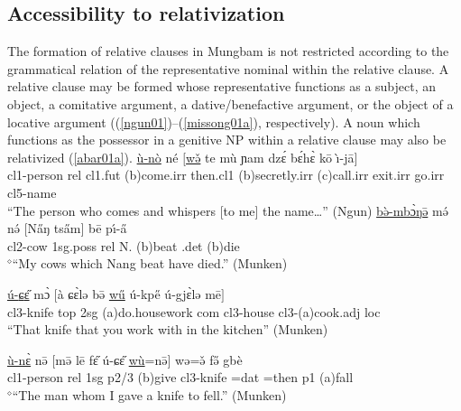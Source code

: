 \documentclass[10pt,twoside]{article}
\makeatletter
\newcommand{\cl}[1]{{\sc cl#1}}
\def\elicited{$^\diamond$}
\def\ML#1{#1\symbol{"1DC6}} %
\renewcommand{\i}{ı}
\def\@{ə}
\def\eh{ɛ}
\def\aw{ɔ}
\def\ng{ŋ}
\def\ny{ɲ}
\def\sh{ɕ}
\def\j{j}
\makeatother
\begin{document}
\subsection{Accessibility to relativization}\label{secMungbamAccessibility}
%

The formation of relative clauses in Mungbam is
not restricted according to the grammatical relation of the
representative nominal within the relative clause.
A relative clause may be formed whose representative
functions as a subject, an object, a comitative argument,
a dative/benefactive argument, or the object of a locative
argument ((\ref{ngun01})--(\ref{missong01a}), respectively).
A noun which functions as the possessor in a genitive NP within
a relative clause may also be relativized (\ref{abar01a}).
%
	\ea	\label{ngun01}
	\gll \uline{\`u-n\`o} n\'e $[$\uline{w\v{\@}} t\ML{e} m\`u \ny\ML{a}m dz\'{\eh} b\'{\eh}h\`{\eh} k\={o} \`\i-j\=a$]$	\\
	\cl1-person {\sc rel} \cl1.{\sc fut} ({\sc b})come.{\sc irr} then.\cl1 ({\sc b})secretly.{\sc irr} ({\sc c})call.{\sc irr}
	exit.{\sc irr} {go}.{\sc irr} \cl5-name	\\
	\glt ``The person who comes and whispers [to me] the name\dots'' (Ngun) %
\z
	\ea	\label{biya01a}
	\gll \uline{b\`{\@}-mb\`{\aw}\ng{\=\@}} m\'{\@} n\'{\@} $[$N\H{a}{\ng} ts\H{a}m$]$ b\=e {p\'\i-\H{a}}	\\
	\cl2-cow {\sc 1sg.poss} {\sc rel} N. ({\sc b})beat {\sc \cl2.det} ({\sc b})die	\\
	\glt \elicited``My cows which Nang beat have died.'' (Munken) %
\z
        \ea \label{munken03}

        \gll \uline{\'u-{\sh}\H{\eh}} m\`{\aw} $[$\`a {\sh}\`{\eh}l{\@} b\={\@} \uline{w\H{u}} \'u-kp\H{e} \'u-g{\j}\`{\eh}l{\@} m\=e$]$        \\
        \cl3-knife {\sc top} {\sc 2sg} {({\sc a})do.housework} {\sc com} {\sc \cl3} \cl3-house \cl3-({\sc a})cook.{\sc adj} {\sc loc}     \\
        \glt ``That knife that you work with in the kitchen'' (Munken)  %
\z

	\ea     \label{munken10}

        \gll \uline{\`u-n\`{\eh}} n\={\@} $[$m\={\@} l\=e f\H{\eh} \'u-{\sh}\H{\eh} \uline{w\`u}=n\={\@}$]$ w{\@}=\v{\@}
        f\H{\@} gb\`e   \\
        \cl1-person {\sc rel} {\sc 1sg} {\sc p2/3} ({\sc b})give \cl3-knife {\sc \cl1=dat} {=}then
        {\sc p1} ({\sc a})fall \\
        \glt \elicited``The man whom I gave a knife to fell.'' (Munken) %
\z
\end{document}
